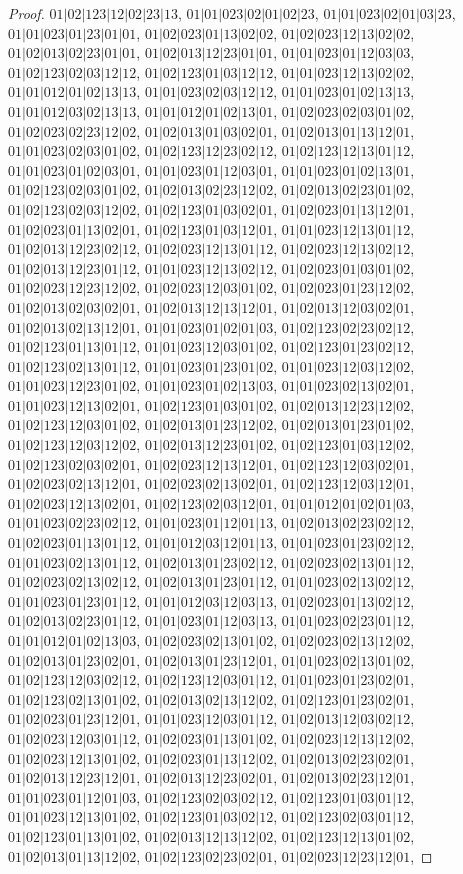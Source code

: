 \documentclass[12pt]{article}
\theoremstyle{plain}
\theoremstyle{definition}
\theoremstyle{remark}
\begin{document}
\begin{proof}
$01|02|123|12|02|23|13$, $01|01|023|02|01|02|23$, $01|01|023|02|01|03|23$, $01|01|023|01|23|01|01$, $01|02|023|01|13|02|02$, $01|02|023|12|13|02|02$, $01|02|013|02|23|01|01$, $01|02|013|12|23|01|01$, $01|01|023|01|12|03|03$, $01|02|123|02|03|12|12$, $01|02|123|01|03|12|12$, $01|01|023|12|13|02|02$, $01|01|012|01|02|13|13$, $01|01|023|02|03|12|12$, $01|01|023|01|02|13|13$, $01|01|012|03|02|13|13$, $01|01|012|01|02|13|01$, $01|02|023|02|03|01|02$, $01|02|023|02|23|12|02$, $01|02|013|01|03|02|01$, $01|02|013|01|13|12|01$, $01|01|023|02|03|01|02$, $01|02|123|12|23|02|12$, $01|02|123|12|13|01|12$, $01|01|023|01|02|03|01$, $01|01|023|01|12|03|01$, $01|01|023|01|02|13|01$, $01|02|123|02|03|01|02$, $01|02|013|02|23|12|02$, $01|02|013|02|23|01|02$, $01|02|123|02|03|12|02$, $01|02|123|01|03|02|01$, $01|02|023|01|13|12|01$, $01|02|023|01|13|02|01$, $01|02|123|01|03|12|01$, $01|01|023|12|13|01|12$, $01|02|013|12|23|02|12$, $01|02|023|12|13|01|12$, $01|02|023|12|13|02|12$, $01|02|013|12|23|01|12$, $01|01|023|12|13|02|12$, $01|02|023|01|03|01|02$, $01|02|023|12|23|12|02$, $01|02|023|12|03|01|02$, $01|02|023|01|23|12|02$, $01|02|013|02|03|02|01$, $01|02|013|12|13|12|01$, $01|02|013|12|03|02|01$, $01|02|013|02|13|12|01$, $01|01|023|01|02|01|03$, $01|02|123|02|23|02|12$, $01|02|123|01|13|01|12$, $01|01|023|12|03|01|02$, $01|02|123|01|23|02|12$, $01|02|123|02|13|01|12$, $01|01|023|01|23|01|02$, $01|01|023|12|03|12|02$, $01|01|023|12|23|01|02$, $01|01|023|01|02|13|03$, $01|01|023|02|13|02|01$, $01|01|023|12|13|02|01$, $01|02|123|01|03|01|02$, $01|02|013|12|23|12|02$, $01|02|123|12|03|01|02$, $01|02|013|01|23|12|02$, $01|02|013|01|23|01|02$, $01|02|123|12|03|12|02$, $01|02|013|12|23|01|02$, $01|02|123|01|03|12|02$, $01|02|123|02|03|02|01$, $01|02|023|12|13|12|01$, $01|02|123|12|03|02|01$, $01|02|023|02|13|12|01$, $01|02|023|02|13|02|01$, $01|02|123|12|03|12|01$, $01|02|023|12|13|02|01$, $01|02|123|02|03|12|01$, $01|01|012|01|02|01|03$, $01|01|023|02|23|02|12$, $01|01|023|01|12|01|13$, $01|02|013|02|23|02|12$, $01|02|023|01|13|01|12$, $01|01|012|03|12|01|13$, $01|01|023|01|23|02|12$, $01|01|023|02|13|01|12$, $01|02|013|01|23|02|12$, $01|02|023|02|13|01|12$, $01|02|023|02|13|02|12$, $01|02|013|01|23|01|12$, $01|01|023|02|13|02|12$, $01|01|023|01|23|01|12$, $01|01|012|03|12|03|13$, $01|02|023|01|13|02|12$, $01|02|013|02|23|01|12$, $01|01|023|01|12|03|13$, $01|01|023|02|23|01|12$, $01|01|012|01|02|13|03$, $01|02|023|02|13|01|02$, $01|02|023|02|13|12|02$, $01|02|013|01|23|02|01$, $01|02|013|01|23|12|01$, $01|01|023|02|13|01|02$, $01|02|123|12|03|02|12$, $01|02|123|12|03|01|12$, $01|01|023|01|23|02|01$, $01|02|123|02|13|01|02$, $01|02|013|02|13|12|02$, $01|02|123|01|23|02|01$, $01|02|023|01|23|12|01$, $01|01|023|12|03|01|12$, $01|02|013|12|03|02|12$, $01|02|023|12|03|01|12$, $01|02|023|01|13|01|02$, $01|02|023|12|13|12|02$, $01|02|023|12|13|01|02$, $01|02|023|01|13|12|02$, $01|02|013|02|23|02|01$, $01|02|013|12|23|12|01$, $01|02|013|12|23|02|01$, $01|02|013|02|23|12|01$, $01|01|023|01|12|01|03$, $01|02|123|02|03|02|12$, $01|02|123|01|03|01|12$, $01|01|023|12|13|01|02$, $01|02|123|01|03|02|12$, $01|02|123|02|03|01|12$, $01|02|123|01|13|01|02$, $01|02|013|12|13|12|02$, $01|02|123|12|13|01|02$, $01|02|013|01|13|12|02$, $01|02|123|02|23|02|01$, $01|02|023|12|23|12|01$, 
\end{proof}
\end{document}
